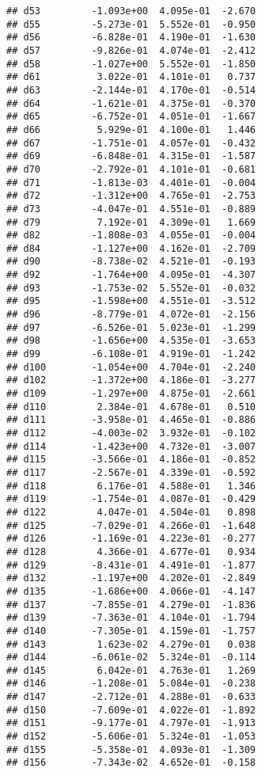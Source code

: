 \documentclass[
]{article}
\begin{document}
\begin{verbatim}
## d53         -1.093e+00  4.095e-01  -2.670
## d55         -5.273e-01  5.552e-01  -0.950
## d56         -6.828e-01  4.190e-01  -1.630
## d57         -9.826e-01  4.074e-01  -2.412
## d58         -1.027e+00  5.552e-01  -1.850
## d61          3.022e-01  4.101e-01   0.737
## d63         -2.144e-01  4.170e-01  -0.514
## d64         -1.621e-01  4.375e-01  -0.370
## d65         -6.752e-01  4.051e-01  -1.667
## d66          5.929e-01  4.100e-01   1.446
## d67         -1.751e-01  4.057e-01  -0.432
## d69         -6.848e-01  4.315e-01  -1.587
## d70         -2.792e-01  4.101e-01  -0.681
## d71         -1.813e-03  4.401e-01  -0.004
## d72         -1.312e+00  4.765e-01  -2.753
## d73         -4.047e-01  4.551e-01  -0.889
## d79          7.192e-01  4.309e-01   1.669
## d82         -1.808e-03  4.055e-01  -0.004
## d84         -1.127e+00  4.162e-01  -2.709
## d90         -8.738e-02  4.521e-01  -0.193
## d92         -1.764e+00  4.095e-01  -4.307
## d93         -1.753e-02  5.552e-01  -0.032
## d95         -1.598e+00  4.551e-01  -3.512
## d96         -8.779e-01  4.072e-01  -2.156
## d97         -6.526e-01  5.023e-01  -1.299
## d98         -1.656e+00  4.535e-01  -3.653
## d99         -6.108e-01  4.919e-01  -1.242
## d100        -1.054e+00  4.704e-01  -2.240
## d102        -1.372e+00  4.186e-01  -3.277
## d109        -1.297e+00  4.875e-01  -2.661
## d110         2.384e-01  4.678e-01   0.510
## d111        -3.958e-01  4.465e-01  -0.886
## d112        -4.003e-02  3.932e-01  -0.102
## d114        -1.423e+00  4.732e-01  -3.007
## d115        -3.566e-01  4.186e-01  -0.852
## d117        -2.567e-01  4.339e-01  -0.592
## d118         6.176e-01  4.588e-01   1.346
## d119        -1.754e-01  4.087e-01  -0.429
## d122         4.047e-01  4.504e-01   0.898
## d125        -7.029e-01  4.266e-01  -1.648
## d126        -1.169e-01  4.223e-01  -0.277
## d128         4.366e-01  4.677e-01   0.934
## d129        -8.431e-01  4.491e-01  -1.877
## d132        -1.197e+00  4.202e-01  -2.849
## d135        -1.686e+00  4.066e-01  -4.147
## d137        -7.855e-01  4.279e-01  -1.836
## d139        -7.363e-01  4.104e-01  -1.794
## d140        -7.305e-01  4.159e-01  -1.757
## d143         1.623e-02  4.279e-01   0.038
## d144        -6.061e-02  5.324e-01  -0.114
## d145         6.042e-01  4.763e-01   1.269
## d146        -1.208e-01  5.084e-01  -0.238
## d147        -2.712e-01  4.288e-01  -0.633
## d150        -7.609e-01  4.022e-01  -1.892
## d151        -9.177e-01  4.797e-01  -1.913
## d152        -5.606e-01  5.324e-01  -1.053
## d155        -5.358e-01  4.093e-01  -1.309
## d156        -7.343e-02  4.652e-01  -0.158

\end{verbatim}
\end{document}
